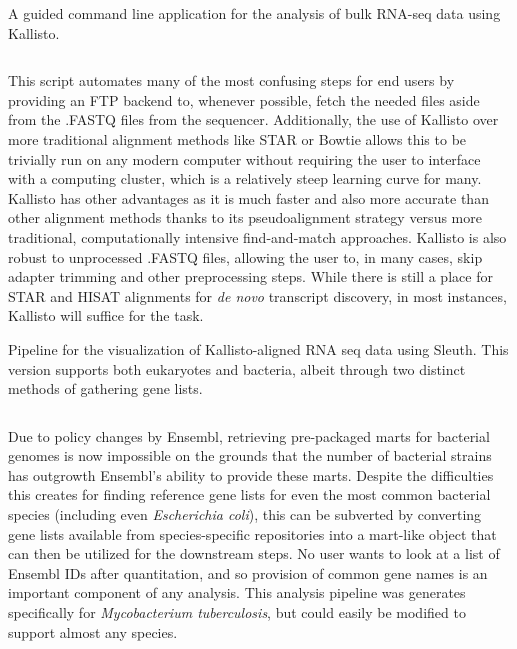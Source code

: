 \begin{code}
\caption{A guided command line application for the analysis of bulk RNA-seq data using Kallisto.}
\label{blinder}

\inputminted[breaklines,frame=single,fontsize=\small]{python}{source/allKallisto.py}

\end{code}

This script automates many of the most confusing steps for end users by providing an FTP backend to, whenever possible, fetch the needed files aside from the .FASTQ files from the sequencer. Additionally, the use of Kallisto over more traditional alignment methods like STAR or Bowtie allows this to be trivially run on any modern computer without requiring the user to interface with a computing cluster, which is a relatively steep learning curve for many. Kallisto has other advantages as it is much faster and also more accurate than other alignment methods thanks to its pseudoalignment strategy versus more traditional, computationally intensive find-and-match approaches. Kallisto is also robust to unprocessed .FASTQ files, allowing the user to, in many cases, skip adapter trimming and other preprocessing steps. While there is still a place for STAR and HISAT alignments for \textit{de novo} transcript discovery, in most instances, Kallisto will suffice for the task. 

\begin{code}
\caption{Pipeline for the visualization of Kallisto-aligned RNA seq data using Sleuth. This version supports both eukaryotes and bacteria, albeit through two distinct methods of gathering gene lists.}
\label{blinder}

\inputminted[breaklines,frame=single,fontsize=\small]{r}{source/sleuther.R}

\end{code}

Due to policy changes by Ensembl, retrieving pre-packaged marts for bacterial genomes is now impossible on the grounds that the number of bacterial strains has outgrowth Ensembl's ability to provide these marts. Despite the difficulties this creates for finding reference gene lists for even the most common bacterial species (including even \textit{Escherichia coli}), this can be subverted by converting gene lists available from species-specific repositories into a mart-like object that can then be utilized for the downstream steps. No user wants to look at a list of Ensembl IDs after quantitation, and so provision of common gene names is an important component of any analysis. This analysis pipeline was generates specifically for \textit{Mycobacterium tuberculosis}, but could easily be modified to support almost any species.

